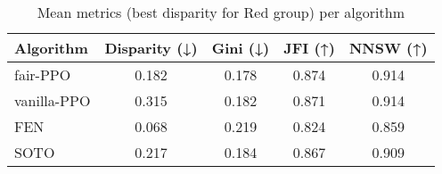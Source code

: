 \begin{table}
\caption{Mean metrics (best disparity for Red group) per algorithm}
\label{tab:best_configs_metrics_red}
\begin{tabular}{lcccc}
\toprule
Algorithm & Disparity (↓) & Gini (↓) & JFI (↑) & NNSW (↑) \\
\midrule
fair-PPO & 0.182 & 0.178 & 0.874 & 0.914 \\
vanilla-PPO & 0.315 & 0.182 & 0.871 & 0.914 \\
FEN & 0.068 & 0.219 & 0.824 & 0.859 \\
SOTO & 0.217 & 0.184 & 0.867 & 0.909 \\
\bottomrule
\end{tabular}
\end{table}
